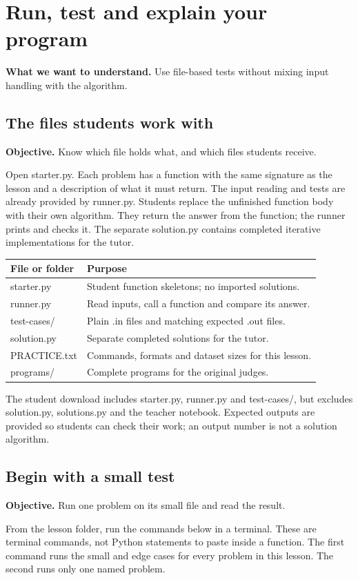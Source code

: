 \documentclass[11pt,a4paper,oneside]{report}
\newcommand{\readinggoal}[1]{\par\textbf{What we want to understand.} #1\par\smallskip}
\newcommand{\sectiongoal}[1]{\par{\color{quiet}\textbf{Objective.} #1}\par\smallskip}
\newcommand{\nextpointer}[1]{\par\smallskip{\color{quiet}\textbf{Next.} #1}\par}
\begin{document}
\chapter{Run, test and explain your program}
\readinggoal{Use file-based tests without mixing input handling with the algorithm.}
\section{The files students work with}
\sectiongoal{Know which file holds what, and which files students receive.}
Open starter.py. Each problem has a function with the same signature as the lesson and a description of what it must return. The input reading and tests are already provided by runner.py. Students replace the unfinished function body with their own algorithm. They return the answer from the function; the runner prints and checks it. The separate solution.py contains completed iterative implementations for the tutor.

\par\medskip\begingroup\small\setlength{\tabcolsep}{4pt}\renewcommand{\arraystretch}{1.3}\begin{tabularx}{\linewidth}{>{\raggedright\arraybackslash}p{30mm}>{\raggedright\arraybackslash}X}\toprule\textbf{File or folder} & \textbf{Purpose}\\\midrule
{}starter.py & Student function skeletons; no imported solutions.\\
{}runner.py & Read inputs, call a function and compare its answer.\\
{}test-cases/ & Plain .in files and matching expected .out files.\\
{}solution.py & Separate completed solutions for the tutor.\\
{}PRACTICE.txt & Commands, formats and dataset sizes for this lesson.\\
{}programs/ & Complete programs for the original judges.\\
\bottomrule\end{tabularx}\endgroup\par\medskip
The student download includes starter.py, runner.py and test-cases/, but excludes solution.py, solutions.py and the teacher notebook. Expected outputs are provided so students can check their work; an output number is not a solution algorithm.

\nextpointer{Run the small tests first.}
\section{Begin with a small test}
\sectiongoal{Run one problem on its small file and read the result.}
From the lesson folder, run the commands below in a terminal. These are terminal commands, not Python statements to paste inside a function. The first command runs the small and edge cases for every problem in this lesson. The second runs only one named problem.
\end{document}
